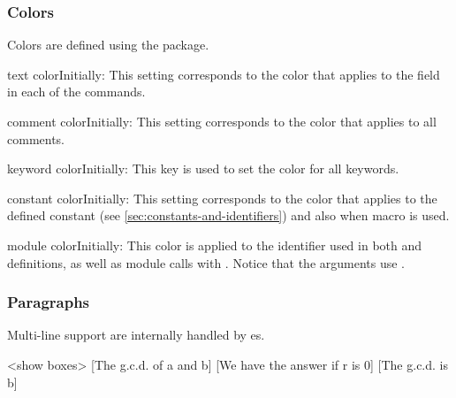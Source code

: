 \documentclass[a4paper, 11pt]{article}
\begin{document}
\subsubsection{Colors}\label{sec:colors}
Colors are defined using the  package.

\begin{Optiondef}{text color}{}{Initially: }
    This setting corresponds to the color that applies to the  field in each of the commands.
\end{Optiondef}

\begin{Optiondef}{comment color}{}{Initially: }
    This setting corresponds to the color that applies to all comments.
\end{Optiondef}

\begin{Optiondef}{keyword color}{}{Initially: }
    This key is used to set the color for all keywords.
\end{Optiondef}

\begin{Optiondef}{constant color}{}{Initially: }
    This setting corresponds to the color that applies to the defined constant (see \cref{sec:constants-and-identifiers}) and also when macro  is used.
\end{Optiondef}

\begin{Optiondef}{module color}{}{Initially: }
    This color is applied to the identifier used in both  and  definitions, as well as module calls with . Notice that the arguments use .
\end{Optiondef}

\subsubsection{Paragraphs}
Multi-line support are internally handled by es.

\medskip
\begingroup
\begin{algorithmic}
    <show boxes>
    [The g.c.d. of a and b]
        [We have the answer if r is 0]
        \EndWhile
        [The g.c.d. is b]
    \EndProcedure
\end{algorithmic}
\endgroup
\end{document}
